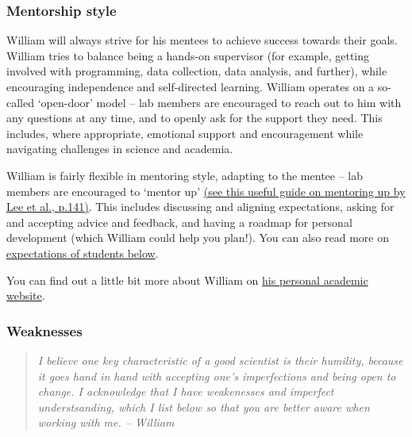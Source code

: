 \documentclass[
]{book}
\begin{document}
\hypertarget{mentorship-style}{%
\subsubsection*{Mentorship style}\label{mentorship-style}}

William will always strive for his mentees to achieve success towards their goals. William tries to balance being a hands-on supervisor (for example, getting involved with programming, data collection, data analysis, and further), while encouraging independence and self-directed learning. William operates on a so-called `open-door' model -- lab members are encouraged to reach out to him with any questions at any time, and to openly ask for the support they need. This includes, where appropriate, emotional support and encouragement while navigating challenges in science and academia.

William is fairly flexible in mentoring style, adapting to the mentee -- lab members are encouraged to `mentor up' \href{https://graduateschool.syr.edu/wp-content/uploads/2017/03/Lee-et-al..pdf}{(see this useful guide on mentoring up by Lee et al., p.141)}. This includes discussing and aligning expectations, asking for and accepting advice and feedback, and having a roadmap for personal development (which William could help you plan!). You can also read more on \protect\hyperlink{student-expectations}{expectations of students below}.

You can find out a little bit more about William on \href{https://williamngiam.github.io}{his personal academic website}.

\hypertarget{weaknesses}{%
\subsubsection*{Weaknesses}\label{weaknesses}}

\begin{quote}
\emph{I believe one key characteristic of a good scientist is their humility, because it goes hand in hand with accepting one's imperfections and being open to change. I acknowledge that I have weakenesses and imperfect understsanding, which I list below so that you are better aware when working with me. -- William}
\end{quote}
\end{document}
